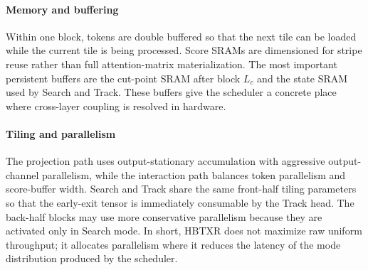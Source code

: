 \documentclass[journal]{IEEEtran}
\begin{document}
\paragraph*{Memory and buffering}
Within one block, tokens are double buffered so that the next tile can be loaded while the current tile is being processed. Score SRAMs are dimensioned for stripe reuse rather than full attention-matrix materialization. The most important persistent buffers are the cut-point SRAM after block $L_c$ and the state SRAM used by Search and Track. These buffers give the scheduler a concrete place where cross-layer coupling is resolved in hardware.

\paragraph*{Tiling and parallelism}
The projection path uses output-stationary accumulation with aggressive output-channel parallelism, while the interaction path balances token parallelism and score-buffer width. Search and Track share the same front-half tiling parameters so that the early-exit tensor is immediately consumable by the Track head. The back-half blocks may use more conservative parallelism because they are activated only in Search mode. In short, HBTXR does not maximize raw uniform throughput; it allocates parallelism where it reduces the latency of the mode distribution produced by the scheduler.
\end{document}

